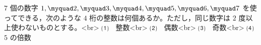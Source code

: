 $7$ 個の数字 $1,\myquad 2,\myquad 3,\myquad 4,\myquad 5,\myquad 6,\myquad 7$ 
を使ってできる，次のような $4$ 桁の整数は何個あるか。ただし，同じ数字は $2$ 度以上使わないものとする。<br>
⑴　整数<br>
⑵　偶数<br>
⑶　奇数<br>
⑷　$5$ の倍数